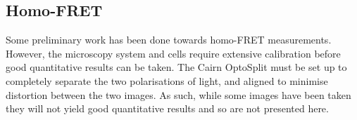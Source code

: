 \documentclass[../main.tex]{subfiles}
\begin{document}
\begin{comment}
\paragraph{Inducement time.} Generally it is recommended to induce some time after inoculating fresh media with overnight cultures; however this is not necessary if the proteins being induced are not toxic. Two parallel growths were done, OD measurements taken every two hours, and images recorded 4 hours after induction and four hours after inoculation.
\begin{center}
\begin{tabular}{ccc}
t=0	&	Inoculate	&	Inoculate \& Induce\\
2	&	Induce	&\\
4	&	Image	&	Image\\
6	&	Image	&
\end{tabular}
\end{center}

\paragraph{Inducer Titre} A logarithmic course of inducer concentrations was checked for expression of the same fusion protein under different promoters.

\begin{center}
\begin{tabular}{cc}
\textbf{Arabinose}	&	\textbf{IPTG} 	\\
0.001\%	&	\SI{1}{\micro\Molar}\\
0.003\%	&	\SI{3}{\micro\Molar}\\
0.01\%	&	\SI{10}{\micro\Molar}\\
0.03\%	&	\SI{30}{\micro\Molar}\\
0.1\%	&	\SI{100}{\micro\Molar}\\

\end{tabular}
\end{center}

\paragraph{Time Course}	A selection of inducer concentration from the inducer titre were re-run with samples being removed and imaged at \SI{2}{\hour}, \SI{3}{\hour} and \SI{4}{\hour} to find optimal expression.
 \end{comment}
\newpage
\subsection{Homo-FRET}
Some preliminary work has been done towards homo-FRET measurements. However, the microscopy system and cells require extensive calibration before good quantitative results can be taken. The Cairn OptoSplit must be set up to completely separate the two polarisations of light, and aligned to minimise distortion between the two images. As such, while some images have been taken they will not yield good quantitative results and so are not presented here.
\end{document}
